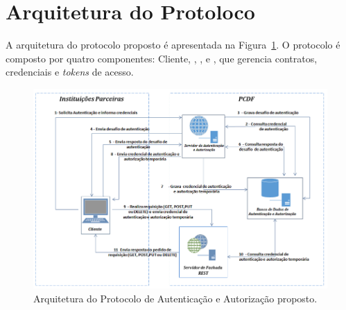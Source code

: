 


\section{Arquitetura do Protoloco}\label{sec:ArqProtocolo}

A arquitetura do protocolo proposto é apresentada na Figura~\ref{fig:arquiteturaprotocolo}. O protocolo é composto por quatro componentes: Cliente, \servidorAA, \servidorRest, e \servidorBD, que gerencia contratos, credenciais e \emph{tokens} de acesso.

\begin{figure}[!htb]
    \centering
    \includegraphics[width=1.0\textwidth]{arquitetura_protocolo1.png}
    \caption{Arquitetura do Protocolo de Autenticação e Autorização proposto.}
    \label{fig:arquiteturaprotocolo}
\end{figure}

